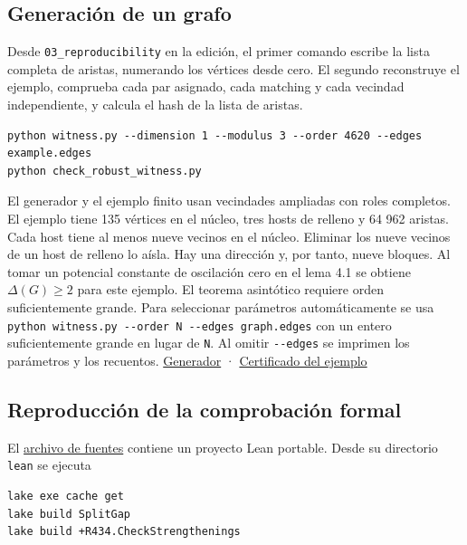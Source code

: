 \documentclass[spanish,11pt,a4paper]{article}
\begin{document}
\subsection{Generación de un grafo}\label{generaciuxf3n-de-un-grafo}

Desde \texttt{03\_reproducibility} en la edición, el primer comando escribe la lista completa de aristas, numerando los vértices desde cero. El segundo reconstruye el ejemplo, comprueba cada par asignado, cada matching y cada vecindad independiente, y calcula el hash de la lista de aristas.

\begin{verbatim}
python witness.py --dimension 1 --modulus 3 --order 4620 --edges example.edges
python check_robust_witness.py
\end{verbatim}

El generador y el ejemplo finito usan vecindades ampliadas con roles completos. El ejemplo tiene 135 vértices en el núcleo, tres hosts de relleno y 64 962 aristas. Cada host tiene al menos nueve vecinos en el núcleo. Eliminar los nueve vecinos de un host de relleno lo aísla. Hay una dirección y, por tanto, nueve bloques. Al tomar un potencial constante de oscilación cero en el lema 4.1 se obtiene \(\Delta(G)\ge2\) para este ejemplo. El teorema asintótico requiere orden suficientemente grande. Para seleccionar parámetros automáticamente se usa \texttt{python\ witness.py\ -\/-order\ N\ -\/-edges\ graph.edges} con un entero suficientemente grande en lugar de \texttt{N}. Al omitir \texttt{-\/-edges} se imprimen los parámetros y los recuentos. \href{https://github.com/jtraverso/split-clique-partition-gap/blob/main/preprints/SPLITGAP/03_reproducibility/witness.py}{Generador} · \href{https://github.com/jtraverso/split-clique-partition-gap/blob/main/preprints/SPLITGAP/03_reproducibility/robust-example.json}{Certificado del ejemplo}

\subsection{Reproducción de la comprobación formal}\label{reproducciuxf3n-de-la-comprobaciuxf3n-formal}

El \href{https://github.com/jtraverso/split-clique-partition-gap/blob/main/preprints/SPLITGAP/05_formalization/split-gap-lean-v1.0.zip}{archivo de fuentes} contiene un proyecto Lean portable. Desde su directorio \texttt{lean} se ejecuta

\begin{verbatim}
lake exe cache get
lake build SplitGap
lake build +R434.CheckStrengthenings
\end{verbatim}
\end{document}
